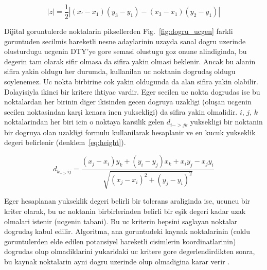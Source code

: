 \documentclass[review]{elsarticle}
\begin{document}
\begin{equation} \label{eq:area}
\left| z \right|=\frac{1}{2}\left| \left( x_{'}-x_{1} \right)\left( y_{3}-y_{1} \right)-\left( x_{3}-x_{1} \right)\left( y_{2}-y_{1} \right) \right|
\end{equation}

Dijital goruntulerde noktalarin piksellerden  Fig.~\ref{fig:dogru_ucgen} farkli goruntuden secilmis hareketli nesne adaylarinin uzayda sanal dogru uzerinde olusturdugu ucgenin DTY'ye gore semasi olustugu goz onune alindiginda, bu degerin tam olarak sifir olmasa da sifira yakin olmasi beklenir. Ancak bu alanin sifira yakin oldugu her durumda, kullanilan uc noktanin dogrudaş oldugu soylenemez. Uc nokta birbirine cok yakin oldugunda da alan sifira yakin olabilir. Dolayisiyla ikinci bir kritere ihtiyac vardir. Eger secilen uc nokta dogrudas ise bu noktalardan her birinin diger ikisinden gecen dogruya uzakligi (oluşan ucgenin secilen noktasindan karşi kenara inen yuksekligi) da sifira yakin olmalidir. $i$,  $j$, $k$ noktalarindan her biri icin o noktaya karsilik gelen $d_{i->jk}$ yuksekligi bir noktanin bir dogruya olan uzakligi formulu kullanilarak hesaplanir ve en kucuk yukseklik degeri belirlenir (denklem~\ref{eq:height}).

\begin{equation} \label{eq:height}
d_{k_{->}ij}=\frac{\left( x_{j}-x_{i} \right)y_{k}+\left( y_{i}-y_{j} \right)x_{k}+x_{i}y_{j}-x_{j}y_{i}}{\sqrt{\left( x_{j}-x_{i} \right)^{2}+\left( y_{j}-y_{i} \right)^{2}}}
\end{equation}

Eger hesaplanan yukseklik degeri belirli bir tolerans araliginda ise, ucuncu bir kriter olarak, bu uc noktanin birbirlerinden belirli bir eşik degeri kadar uzak olmalari istenir (ucgenin tabani). Bu uc kriterin hepsini saglayan noktalar dogrudaş kabul edilir. Algoritma, ana goruntudeki kaynak noktalarinin (coklu goruntulerden elde edilen potansiyel hareketli cisimlerin koordinatlarinin) dogrudas olup olmadiklarini yukaridaki uc kritere gore degerlendirdikten sonra, bu kaynak noktalarin ayni dogru uzerinde olup olmadigina karar verir \citep{chen2001}. 
\end{document}
